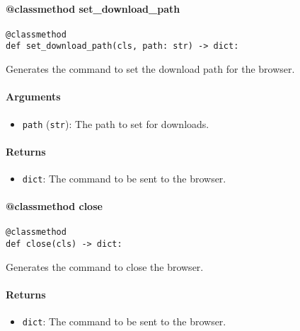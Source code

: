 \documentclass{article}
\begin{document}
\paragraph{@classmethod set\_download\_path}

\begin{lstlisting}[style=pythonstyle]
@classmethod
def set_download_path(cls, path: str) -> dict:
\end{lstlisting}

\noindent Generates the command to set the download path for the browser.

\paragraph{Arguments}

\begin{itemize}
    \item \lstinline[style=pythonstyle]|path| (\lstinline[style=pythonstyle]|str|): The path to set for downloads.
\end{itemize}

\paragraph{Returns}

\begin{itemize}
    \item \lstinline[style=pythonstyle]|dict|: The command to be sent to the browser.
\end{itemize}

\paragraph{@classmethod close}

\begin{lstlisting}[style=pythonstyle]
@classmethod
def close(cls) -> dict:
\end{lstlisting}

\noindent Generates the command to close the browser.

\paragraph{Returns}

\begin{itemize}
    \item \lstinline[style=pythonstyle]|dict|: The command to be sent to the browser.
\end{itemize}
\end{document}
